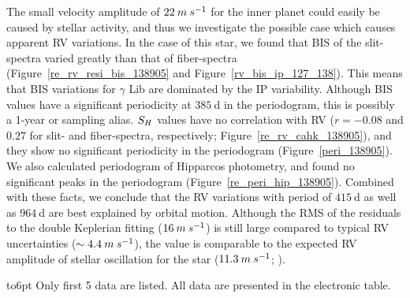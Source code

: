 \documentclass[]{pasj01}
\begin{document}
The small velocity amplitude of $22\>{\rm m\>s^{-1}}$ for the inner planet could easily be caused by stellar activity, and thus we investigate the possible case which causes apparent RV variations.
In the case of this star, we found that BIS of the slit-spectra varied greatly than that of fiber-spectra (Figure~\ref{re_rv_resi_bis_138905} and Figure~\ref{rv_bis_ip_127_138}).
This means that BIS variations for $\gamma$ Lib are dominated by the IP variability.
Although BIS values have a significant periodicity at $385\>$d in the periodogram, this is possibly a 1-year or sampling alias.
$S_{\rm H}$ values have no correlation with RV ($r=-0.08$ and $0.27$ for slit- and fiber-spectra, respectively; Figure~\ref{re_rv_cahk_138905}), and they show no significant periodicity in the periodogram (Figure~\ref{peri_138905}).
We also calculated periodogram of Hipparcos photometry, and found no significant peaks in the periodogram (Figure~\ref{re_peri_hip_138905}).
Combined with these facts, we conclude that the RV variations with period of $415\>$d as well as $964\>$d are best explained by orbital motion.
Although the RMS of the residuals to the double Keplerian fitting ($16\>{\rm m\>s^{-1}}$) is still large compared to typical RV uncertainties ($\sim4.4\>{\rm m\>s^{-1}}$), 
the value is comparable to the expected RV amplitude of stellar oscillation for the star ($11.3\>{\rm m\>s^{-1}}$; \cite{Kjeldsen1995}).

\begin{table}
 \begin{tabnote}
\noindent
\hbox to6pt{\footnotemark[$*$]\hss}\unskip%
Only first 5 data are listed. All data are presented in the electronic table. 
\end{tabnote}
\label{rvtab_138}
\end{table}
\end{document}
